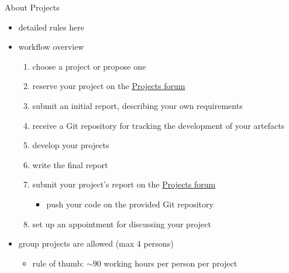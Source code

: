 \documentclass[presentation]{beamer}\mode<presentation>{\usetheme{AMSBolognaFC}}
\begin{document}
\begin{frame}[c]{About Projects}
    \begin{itemize}
        \item detailed rules here
		\\
        \uurl{\projectRules}

        \vfill

        \item workflow overview
        \begin{enumerate}
            \item \alert{choose} a project or \alert{propose} one
            \item reserve your project on the \href{\projectsForum}{Projects forum}
            \item submit an \alert{initial report}, describing your own requirements
            \item receive a Git repository for tracking the development of your artefacts
            \item develop your projects
            \item write the \alert{final report}
            \item submit your project's \alert{report} on the \href{\projectsForum}{Projects forum}
			\begin{itemize}
				\item push your code on the provided Git repository
			\end{itemize}
            \item set up an appointment for discussing your project
        \end{enumerate}

        \vfill

        \item group projects are allowed (max 4 persons)
        \begin{itemize}
            \item rule of thumb: $\sim90$ working hours per person per project
        \end{itemize}
    \end{itemize}
\end{frame}
\end{document}
